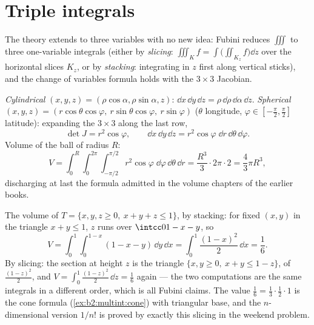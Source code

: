 \section{Triple integrals}

The theory extends to three variables with no new idea: Fubini
reduces $\iiint$ to three one-variable integrals (either by
\emph{slicing}: $\iiint_K f = \int\bigl(\iint_{K_z}
f\bigr)\dd z$ over the horizontal slices $K_z$, or by
\emph{stacking}: integrating in $z$ first along vertical sticks),
and the change of variables formula holds with the $3 \times 3$
Jacobian.

\begin{example}\label{ex:b2:multint:spherical}
\emph{Cylindrical} $(x, y, z) = (\rho\cos\alpha, \rho\sin\alpha,
z)$: $\dd x\,\dd y\,\dd z = \rho\,\dd\rho\,\dd\alpha\,\dd z$.
\emph{Spherical} $(x, y, z) = (r\cos\theta\cos\varphi,\
r\sin\theta\cos\varphi,\ r\sin\varphi)$ ($\theta$ longitude,
$\varphi \in [-\frac\pi2, \frac\pi2]$ latitude): expanding the $3
\times 3$ \omterm{def:b2:linalg:det}{determinant} along the last row,
\[
\det J = r^2\cos\varphi ,
\qquad
\dd x\,\dd y\,\dd z
= r^2\cos\varphi\;\dd r\,\dd\theta\,\dd\varphi .
\]
Volume of the ball of radius $R$:
\[
V = \int_0^R\!\!\int_0^{2\pi}\!\!\int_{-\pi/2}^{\pi/2}
r^2\cos\varphi\;\dd\varphi\,\dd\theta\,\dd r
= \frac{R^3}{3}\cdot 2\pi \cdot 2
= \boxed{\frac43\pi R^3} ,
\]
discharging at last the formula admitted in the volume chapters of
the earlier books.
\end{example}

\begin{example}
\label{ex:b2:multint:tetra}
The volume of $T = \{x, y, z \geq 0,\ x + y + z \leq 1\}$, by
stacking: for fixed $(x, y)$ in the triangle $x + y \leq 1$,
$z$ runs over $\intcc0{1 - x - y}$, so
\[
V = \int_0^1\!\!\int_0^{1-x}(1 - x - y)\,\dd y\,\dd x
= \int_0^1\frac{(1 - x)^2}{2}\,\dd x = \frac16 .
\]
By slicing: the section at height $z$ is the triangle $\{x, y
\geq 0,\ x + y \leq 1 - z\}$, of  $\frac{(1-z)^2}2$, and
$V = \int_0^1\frac{(1-z)^2}2\,\dd z = \frac16$ again --- the
two computations are the same integrals in a different
order, which is all Fubini claims. The value $\frac16 =
\frac13\cdot\frac12\cdot1$ is the cone formula
(\cref{ex:b2:multint:cone}) with triangular base, and the
$n$-dimensional version $1/n!$ is proved by exactly this
slicing in the weekend problem.
\end{example}

